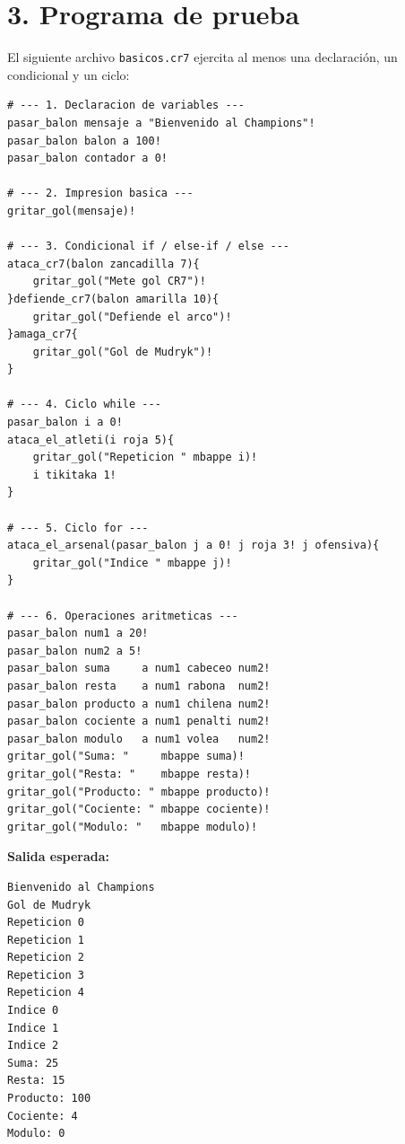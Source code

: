\documentclass[12pt,a4paper]{article}
\begin{document}
\section*{3. Programa de prueba}

El siguiente archivo \texttt{basicos.cr7} ejercita al menos una declaración, un condicional y un ciclo:

\begin{lstlisting}[caption={examples/basicos.cr7}]
# --- 1. Declaracion de variables ---
pasar_balon mensaje a "Bienvenido al Champions"!
pasar_balon balon a 100!
pasar_balon contador a 0!

# --- 2. Impresion basica ---
gritar_gol(mensaje)!

# --- 3. Condicional if / else-if / else ---
ataca_cr7(balon zancadilla 7){
    gritar_gol("Mete gol CR7")!
}defiende_cr7(balon amarilla 10){
    gritar_gol("Defiende el arco")!
}amaga_cr7{
    gritar_gol("Gol de Mudryk")!
}

# --- 4. Ciclo while ---
pasar_balon i a 0!
ataca_el_atleti(i roja 5){
    gritar_gol("Repeticion " mbappe i)!
    i tikitaka 1!
}

# --- 5. Ciclo for ---
ataca_el_arsenal(pasar_balon j a 0! j roja 3! j ofensiva){
    gritar_gol("Indice " mbappe j)!
}

# --- 6. Operaciones aritmeticas ---
pasar_balon num1 a 20!
pasar_balon num2 a 5!
pasar_balon suma     a num1 cabeceo num2!
pasar_balon resta    a num1 rabona  num2!
pasar_balon producto a num1 chilena num2!
pasar_balon cociente a num1 penalti num2!
pasar_balon modulo   a num1 volea   num2!
gritar_gol("Suma: "     mbappe suma)!
gritar_gol("Resta: "    mbappe resta)!
gritar_gol("Producto: " mbappe producto)!
gritar_gol("Cociente: " mbappe cociente)!
gritar_gol("Modulo: "   mbappe modulo)!
\end{lstlisting}

\textbf{Salida esperada:}

\begin{Verbatim}[frame=single, fontsize=\small]
Bienvenido al Champions
Gol de Mudryk
Repeticion 0
Repeticion 1
Repeticion 2
Repeticion 3
Repeticion 4
Indice 0
Indice 1
Indice 2
Suma: 25
Resta: 15
Producto: 100
Cociente: 4
Modulo: 0
\end{Verbatim}
\end{document}

